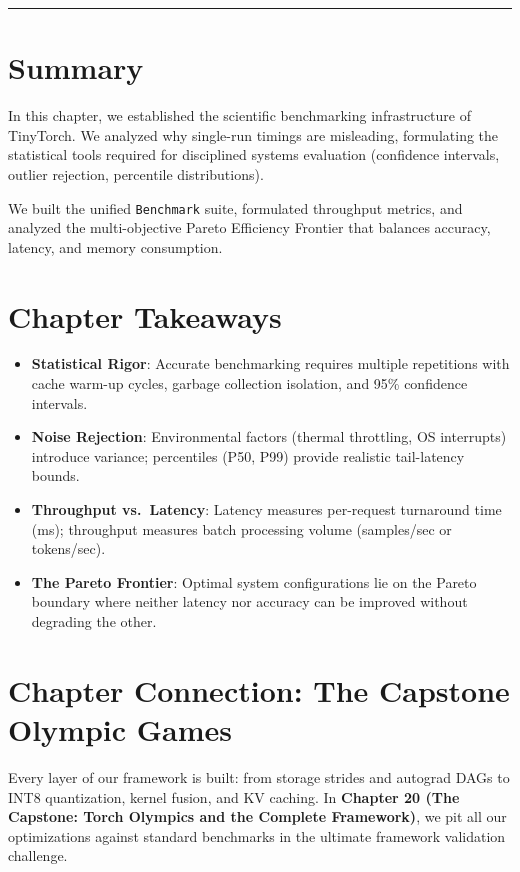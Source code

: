 \documentclass[
  letterpaper,
]{scrbook}
\providecommand{\tightlist}{%
  \setlength{\itemsep}{0pt}\setlength{\parskip}{0pt}}
\begin{document}
\begin{center}\rule{0.5\linewidth}{0.5pt}\end{center}

\section{Summary}\label{summary-19}

In this chapter, we established the scientific benchmarking
infrastructure of TinyTorch. We analyzed why single-run timings are
misleading, formulating the statistical tools required for disciplined
systems evaluation (confidence intervals, outlier rejection, percentile
distributions).

We built the unified \texttt{Benchmark} suite, formulated throughput
metrics, and analyzed the multi-objective Pareto Efficiency Frontier
that balances accuracy, latency, and memory consumption.

\section{Chapter Takeaways}\label{chapter-takeaways-19}

\begin{itemize}
\tightlist
\item
  \textbf{Statistical Rigor}: Accurate benchmarking requires multiple
  repetitions with cache warm-up cycles, garbage collection isolation,
  and 95\% confidence intervals.
\item
  \textbf{Noise Rejection}: Environmental factors (thermal throttling,
  OS interrupts) introduce variance; percentiles (P50, P99) provide
  realistic tail-latency bounds.
\item
  \textbf{Throughput vs.~Latency}: Latency measures per-request
  turnaround time (ms); throughput measures batch processing volume
  (samples/sec or tokens/sec).
\item
  \textbf{The Pareto Frontier}: Optimal system configurations lie on the
  Pareto boundary where neither latency nor accuracy can be improved
  without degrading the other.
\end{itemize}

\section{Chapter Connection: The Capstone Olympic
Games}\label{chapter-connection-the-capstone-olympic-games}

Every layer of our framework is built: from storage strides and autograd
DAGs to INT8 quantization, kernel fusion, and KV caching. In
\textbf{Chapter 20 (The Capstone: Torch Olympics and the Complete
Framework)}, we pit all our optimizations against standard benchmarks in
the ultimate framework validation challenge.
\end{document}
